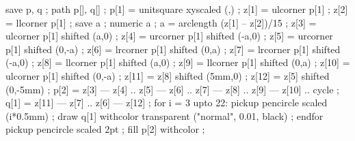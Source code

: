 save p, q ; path p[], q[] ;
p[1] = unitsquare xyscaled (\overlaywidth,\overlayheight) ;
z[1] = ulcorner p[1] ;
z[2] = llcorner p[1] ;
save a ; numeric a ;
a = arclength (z[1] -- z[2])/15 ;
z[3] = ulcorner p[1] shifted (a,0) ;
z[4] = urcorner p[1] shifted (-a,0) ;
z[5] = urcorner p[1] shifted (0,-a) ;
z[6] = lrcorner p[1] shifted (0,a) ;
z[7] = lrcorner p[1] shifted (-a,0) ;
z[8] = llcorner p[1] shifted (a,0) ;
z[9] = llcorner p[1] shifted (0,a) ;
z[10] = ulcorner p[1] shifted (0,-a) ;
z[11] = z[8] shifted (5mm,0) ;
z[12] = z[5] shifted (0,-5mm) ;
p[2] = z[3] --- z[4] .. z[5] --- z[6]  .. z[7] --- z[8] .. z[9] --- z[10] .. cycle ;
q[1] = z[11] --- z[7] .. z[6] --- z[12] ;
for i = 3 upto 22:
	pickup pencircle scaled (i*0.5mm) ;
	draw q[1] withcolor transparent ("normal", 0.01, black) ;
endfor
pickup pencircle scaled 2pt ;
fill p[2] withcolor  ;
\stopuniqueMPgraphic


\Important%
  {\blank[line]}


\setupitemize[1][color={simpleslides:itemize:color}]

\protect
\stopmodule

\endinput

